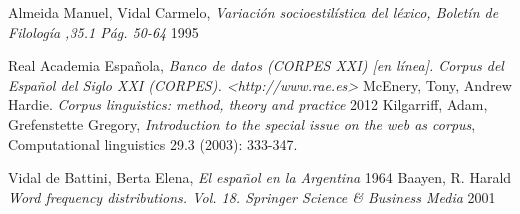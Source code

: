 \documentclass[a4paper,11pt]{article}
\begin{document}
\begin{thebibliography}{9}
     Almeida Manuel, Vidal Carmelo,
    \emph{Variación socioestilística del léxico, Boletín de Filología ,35.1 Pág. 50-64}
    1995


    Real Academia Española,
    \emph{Banco de datos (CORPES XXI) [en línea]. Corpus del Español del
    Siglo XXI (CORPES). <http://www.rae.es>}
    McEnery, Tony,  Andrew Hardie.
    \emph{Corpus linguistics: method, theory and practice}
    2012
   Kilgarriff, Adam, Grefenstette Gregory,
   \emph{Introduction to the special issue on the web as corpus},
   Computational linguistics 29.3 (2003): 333-347.

    Vidal de Battini, Berta Elena,
    \emph{El español en la Argentina}
    1964
    Baayen, R. Harald
    \emph{Word frequency distributions. Vol. 18. Springer Science \& Business Media}
    2001


\end{thebibliography}
\end{document}
